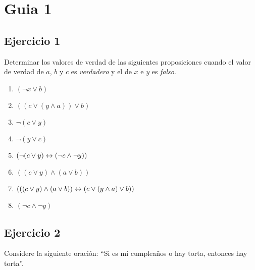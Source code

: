 





\maketitle
\newpage

\tableofcontents
\newpage

\section{Guia 1}

\subsection{Ejercicio 1}
Determinar los valores de verdad de las siguientes proposiciones cuando el valor de verdad de $a$, $b$ y $c$ es \textit{verdadero} y el de $x$ e $y$ es \textit{falso}.

\begin{multicols}{2}
      \begin{enumerate}[label=\alph*)]
            \item $(\neg x \lor b)$ \True
            \item $((c \lor (y \land a)) \lor b)$ \True
            \item $\neg (c \lor y)$ \False
            \item $\neg (y \lor c)$ \False
            \item $(\neg(c \lor y) \leftrightarrow (\neg c \land \neg y))$ \True
            \item $((c \lor y) \land (a \lor b))$ \True
            \item $(((c \lor y) \land (a \lor b)) \leftrightarrow (c \lor (y \land a) \lor b))$ \True
            \item $(\neg c \land \neg y)$ \False
      \end{enumerate}
\end{multicols}

\subsection{Ejercicio 2}
Considere la siguiente oración: ``Si es mi cumpleaños o hay torta, entonces hay torta''.

